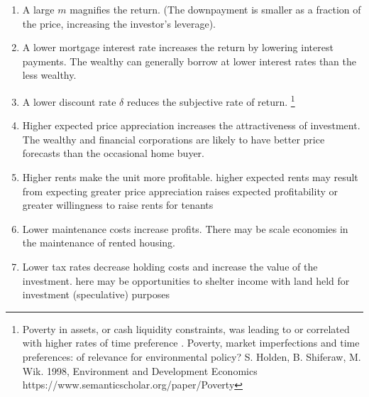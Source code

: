 \begin{enumerate}
\item A large $m$ magnifies the return. (The downpayment is smaller as a fraction of the price, increasing the investor's leverage). 

\item A lower mortgage interest rate increases the return by lowering interest payments.  The wealthy can generally borrow  at lower interest rates than the less wealthy. 

\item A lower discount rate $\delta$ reduces the subjective rate of return.  \footnote{Poverty in assets, or cash liquidity constraints, was leading to or correlated with higher rates of time preference \cite{HoldenShiferaw--1998}. Poverty, market imperfections and time preferences: of relevance for environmental policy?   S. Holden, B. Shiferaw, M. Wik.  1998, Environment and Development Economics https://www.semanticscholar.org/paper/Poverty %
}
\item Higher expected price appreciation increases the attractiveness of investment. The wealthy and financial corporations  are likely to have better price forecasts than  the occasional home buyer.
\item Higher rents make the unit more profitable. higher expected  rents may result from expecting greater price appreciation raises expected profitability or greater willingness to raise rents for tenants 

\item Lower maintenance costs increase profits. There may be scale economies in the maintenance  of rented housing. 
\item Lower tax rates decrease holding costs and increase the value of the investment. here may be opportunities to shelter income with land held for investment (speculative) purposes
\end{enumerate}

